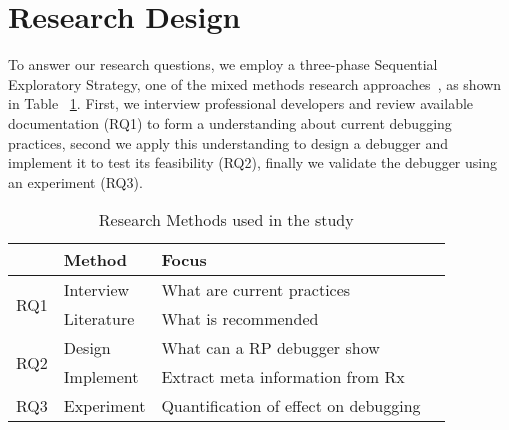 \section{Research Design} %
To answer our research questions, we employ a three-phase Sequential
Exploratory Strategy, one of the mixed methods research approaches~\cite
{creswell2013research,hanson2005mixed}, as shown in Table~%
\ref{research-methods}.  First, we interview professional developers and
review available documentation (RQ1) to form a understanding about
current debugging practices, second we apply this understanding to
design a debugger and implement it to test its feasibility (RQ2),
finally we validate the debugger using an experiment (RQ3).

\begin{table}[t]
    \centering
    \begin{tabularx}{\columnwidth}
        {lllX}
        \hline
        \textbf{} & \textbf{Method} & \textbf{Focus} \\
        \hline
        \multirow{2}{*}{RQ1} & Interview & What are current practices \\
        & Literature & What is recommended \\
        \multirow{2}{*}{RQ2} & Design & What can a RP debugger show \\
        & Implement & Extract meta information from Rx \\
        RQ3 & Experiment & Quantification of effect on debugging \\
        \hline
    \end{tabularx}
    \caption{Research Methods used in the study}%
    \label{research-methods}
\end{table}

\iffalse \todo{ qualitive data quantitive design, implemented, tested
with real developers buzz words:  mixed methods, grounded theory }
\fi
